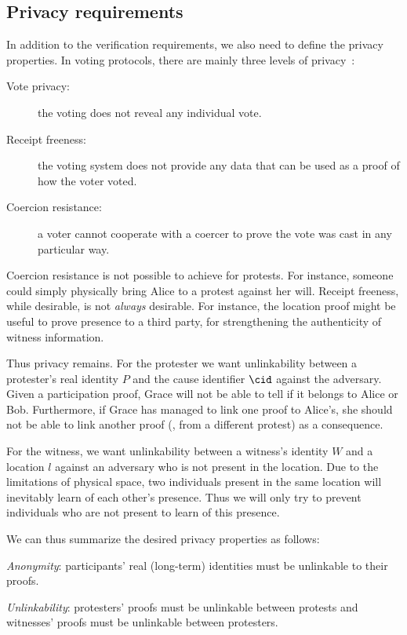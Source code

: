 \subsection{Privacy requirements}%
\label{privacy-properties}

In addition to the verification requirements, we also need to define the 
privacy properties.
In voting protocols, there are mainly three levels of 
privacy~\cite{VerifyingPrivacyPropertiesOfVotingProtocols}:
\begin{description}
  \item[Vote privacy:] the voting does not reveal any individual vote.
  \item[Receipt freeness:] the voting system does not provide any data that can 
    be used as a proof of how the voter voted.
  \item[Coercion resistance:] a voter cannot cooperate with a coercer to prove 
    the vote was cast in any particular way.
\end{description}

Coercion resistance is not possible to achieve for protests.
For instance, someone could simply physically bring Alice to a protest against 
her will.
Receipt freeness, while desirable, is not \emph{always} desirable.
For instance, the location proof might be useful to prove presence to a third 
party, \eg for strengthening the authenticity of witness information.

Thus privacy remains.
For the protester we want unlinkability between a protester's real identity 
\(P\) and the cause identifier \(\cid\) against the adversary.
Given a participation proof, Grace will not be able to tell if it belongs to 
Alice or Bob.
Furthermore, if Grace has managed to link one proof to Alice's, she should not 
be able to link another proof (\eg, from a different protest) as a consequence.

For the witness, we want unlinkability between a witness's identity \(W\) and a 
location \(l\) against an adversary who is not present in the location.
Due to the limitations of physical space, two individuals present in the same 
location will inevitably learn of each other's presence.
Thus we will only try to prevent individuals who are not present to learn of 
this presence.

We can thus summarize the desired privacy properties as follows:
\begin{requirements}[P]
\item\label{ProofUnlink} \emph{Anonymity}: participants' real (long-term) 
  identities must be unlinkable to their proofs.
\item\label{ProtestUnlink} \emph{Unlinkability}: protesters' proofs must be 
  unlinkable between protests and witnesses' proofs must be unlinkable between 
  protesters.
\end{requirements}


